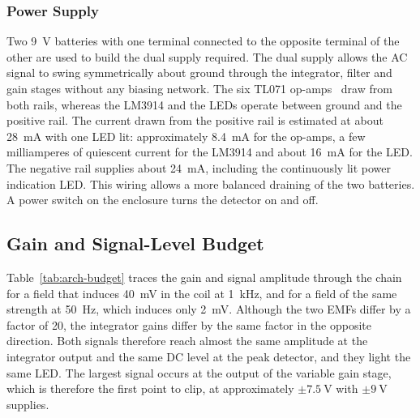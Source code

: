 \documentclass[11pt,a4paper]{article}
\begin{document}
\subsubsection{Power Supply}
Two \SI{9}{\volt} batteries with one terminal connected to the opposite terminal of the other are used to build the dual supply required. The dual supply allows the AC signal to swing symmetrically about ground through the integrator, filter and gain stages without any biasing network. The six TL071 op-amps~\cite{ti_tl07x} draw from both rails, whereas the LM3914 and the LEDs operate between ground and the positive rail. The current drawn from the positive rail is estimated at about \SI{28}{\milli\ampere} with one LED lit: approximately \SI{8.4}{\milli\ampere} for the op-amps, a few milliamperes of quiescent current for the LM3914 and about \SI{16}{\milli\ampere} for the LED. The negative rail supplies about \SI{24}{\milli\ampere}, including the continuously lit power indication LED. This wiring allows a more balanced draining of the two batteries. A power switch on the enclosure turns the detector on and off.

\subsection{Gain and Signal-Level Budget}
\label{sec:arch-budget}

Table~\ref{tab:arch-budget} traces the gain and signal amplitude through the chain for a field that induces \SI{40}{\milli\volt} in the coil at \SI{1}{\kilo\hertz}, and for a field of the same strength at \SI{50}{\hertz}, which induces only \SI{2}{\milli\volt}. Although the two EMFs differ by a factor of 20, the integrator gains differ by the same factor in the opposite direction. Both signals therefore reach almost the same amplitude at the integrator output and the same DC level at the peak detector, and they light the same LED. The largest signal occurs at the output of the variable gain stage, which is therefore the first point to clip, at approximately $\pm\SI{7.5}{\volt}$ with $\pm\SI{9}{\volt}$ supplies.
\end{document}
